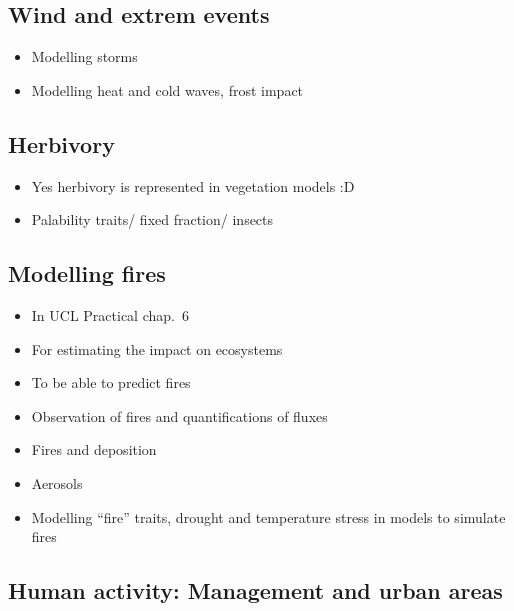 \documentclass[
  oneside]{book}
\providecommand{\tightlist}{%
  \setlength{\itemsep}{0pt}\setlength{\parskip}{0pt}}
\begin{document}
\hypertarget{wind-and-extrem-events}{%
\subsection{Wind and extrem events}\label{wind-and-extrem-events}}

\begin{itemize}
\tightlist
\item
  Modelling storms
\item
  Modelling heat and cold waves, frost impact
\end{itemize}

\hypertarget{herbivory}{%
\subsection{Herbivory}\label{herbivory}}

\begin{itemize}
\tightlist
\item
  Yes herbivory is represented in vegetation models :D
\item
  Palability traits/ fixed fraction/ insects
\end{itemize}

\hypertarget{modelling-fires}{%
\subsection{Modelling fires}\label{modelling-fires}}

\begin{itemize}
\tightlist
\item
  In UCL Practical chap.~6
\item
  For estimating the impact on ecosystems
\item
  To be able to predict fires
\item
  Observation of fires and quantifications of fluxes
\item
  Fires and deposition
\item
  Aerosols
\item
  Modelling ``fire'' traits, drought and temperature stress in models to simulate fires
\end{itemize}

\hypertarget{human-activity-management-and-urban-areas}{%
\subsection{Human activity: Management and urban areas}\label{human-activity-management-and-urban-areas}}
\end{document}
